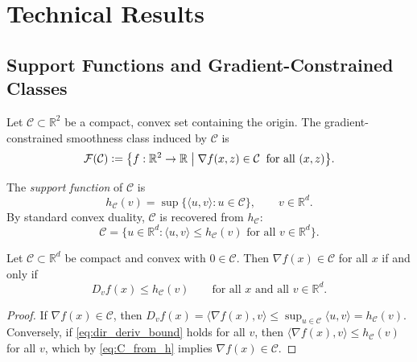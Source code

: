 \section{Technical Results}\label{sec:technical}


\subsection{Support Functions and Gradient-Constrained Classes}\label{sec:technical:support}

\begin{definition}\label{def:gradient_class}
	Let $\mathcal{C} \subset \mathbb{R}^2$ be a compact, convex set containing the origin.
	The gradient-constrained smoothness class induced by $\mathcal{C}$ is
	\begin{equation*}
		\mathcal{F}(\mathcal{C}) \vcentcolon= \bigl\{ f : \mathbb{R}^2 \to \mathbb{R} \;\big|\; \nabla f(x,z) \in \mathcal{C} \;\; \text{for all } (x,z) \bigr\}.
	\end{equation*}
\end{definition}

The \emph{support function} of $\mathcal{C}$ is
\begin{equation*}
	h_{\mathcal{C}}(v) = \sup\bigl\{ \langle u, v \rangle : u \in \mathcal{C} \bigr\}, \qquad v \in \mathbb{R}^d.
\end{equation*}
By standard convex duality, $\mathcal{C}$ is recovered from $h_{\mathcal{C}}$:
\begin{equation}\label{eq:C_from_h}
	\mathcal{C} = \bigl\{ u \in \mathbb{R}^d : \langle u, v \rangle \leq h_{\mathcal{C}}(v) \text{ for all } v \in \mathbb{R}^d \bigr\}.
\end{equation}

\begin{lemma}\label{lem:gradient_support}
	Let $\mathcal{C} \subset \mathbb{R}^d$ be compact and convex with $0 \in \mathcal{C}$.
	Then $\nabla f(x) \in \mathcal{C}$ for all $x$ if and only if
	\begin{equation}\label{eq:dir_deriv_bound}
		D_v f(x) \leq h_{\mathcal{C}}(v) \qquad \text{for all } x \text{ and all } v \in \mathbb{R}^d.
	\end{equation}
\end{lemma}

\begin{proof}
	If $\nabla f(x) \in \mathcal{C}$, then $D_v f(x) = \langle \nabla f(x), v \rangle \leq \sup_{u \in \mathcal{C}} \langle u, v \rangle = h_{\mathcal{C}}(v)$.
	Conversely, if \eqref{eq:dir_deriv_bound} holds for all $v$, then $\langle \nabla f(x), v \rangle \leq h_{\mathcal{C}}(v)$ for all $v$, which by \eqref{eq:C_from_h} implies $\nabla f(x) \in \mathcal{C}$.
\end{proof}

